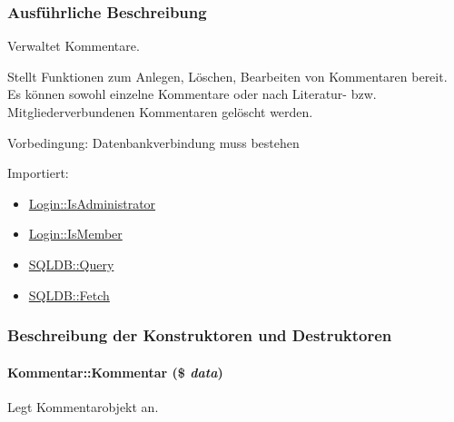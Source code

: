\subsubsection{Ausf\"{u}hrliche Beschreibung}
Verwaltet Kommentare. 

Stellt Funktionen zum Anlegen, Löschen, Bearbeiten von Kommentaren bereit. Es können sowohl einzelne Kommentare oder nach Literatur- bzw. Mitgliederverbundenen Kommentaren gelöscht werden. \begin{Desc}
\item[Vorbedingung:]Datenbankverbindung muss bestehen \end{Desc}
\begin{Desc}
\item[Importiert:]\begin{itemize}
\item \hyperlink{classLogin_6c120224aa6719f58c6ccd08acc28758}{Login::Is\-Administrator}\item \hyperlink{classLogin_70d2747b0aa454f4203a789afea25318}{Login::Is\-Member}\item \hyperlink{classSQLDB_fc6ffa8df50f68f07d9f5e3385b96d7a}{SQLDB::Query}\item \hyperlink{classSQLDB_a55c00ce1de0e50e0a58cae61892ba35}{SQLDB::Fetch} \end{itemize}
\end{Desc}




\subsubsection{Beschreibung der Konstruktoren und Destruktoren}
\hypertarget{classKommentar_ea774e2108c754890c602dfdd53d64e1}{
\paragraph[Kommentar]{\setlength{\rightskip}{0pt plus 5cm}Kommentar::Kommentar (\$ {\em data})}\hfill}
\label{classKommentar_ea774e2108c754890c602dfdd53d64e1}


Legt Kommentarobjekt an. 

